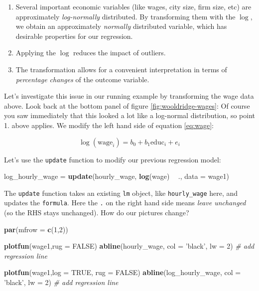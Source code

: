 \documentclass[]{book}
\newenvironment{Shaded}{\begin{snugshade}}{\end{snugshade}}
\newcommand{\KeywordTok}[1]{\textcolor[rgb]{0.13,0.29,0.53}{\textbf{#1}}}
\newcommand{\DataTypeTok}[1]{\textcolor[rgb]{0.13,0.29,0.53}{#1}}
\newcommand{\DecValTok}[1]{\textcolor[rgb]{0.00,0.00,0.81}{#1}}
\newcommand{\StringTok}[1]{\textcolor[rgb]{0.31,0.60,0.02}{#1}}
\newcommand{\CommentTok}[1]{\textcolor[rgb]{0.56,0.35,0.01}{\textit{#1}}}
\newcommand{\OtherTok}[1]{\textcolor[rgb]{0.56,0.35,0.01}{#1}}
\newcommand{\OperatorTok}[1]{\textcolor[rgb]{0.81,0.36,0.00}{\textbf{#1}}}
\newcommand{\NormalTok}[1]{#1}
\providecommand{\tightlist}{%
  \setlength{\itemsep}{0pt}\setlength{\parskip}{0pt}}
\begin{document}
\begin{enumerate}
\def\labelenumi{\arabic{enumi}.}
\tightlist
\item
  Several important economic variables (like wages, city size, firm
  size, etc) are approximately \emph{log-normally} distributed. By
  transforming them with the \(\log\), we obtain an approximately
  \emph{normally} distributed variable, which has desirable properties
  for our regression.
\item
  Applying the \(\log\) reduces the impact of outliers.
\item
  The transformation allows for a convenient interpretation in terms of
  \emph{percentage changes} of the outcome variable.
\end{enumerate}

Let's investigate this issue in our running example by transforming the
wage data above. Look back at the bottom panel of figure
\ref{fig:wooldridge-wages}: Of course you saw immediately that this
looked a lot like a log-normal distribution, so point 1. above applies.
We modify the left hand side of equation \eqref{eq:wage}:

\begin{equation}
\log(\text{wage}_i) = b_0 + b_1 \text{educ}_i + e_i \label{eq:log-wage}
\end{equation}

Let's use the \texttt{update} function to modify our previous regression
model:

\begin{Shaded}
\begin{Highlighting}[]
\NormalTok{log_hourly_wage =}\StringTok{ }\KeywordTok{update}\NormalTok{(hourly_wage, }\KeywordTok{log}\NormalTok{(wage) }\OperatorTok{~}\StringTok{ }\NormalTok{., }\DataTypeTok{data =}\NormalTok{ wage1)}
\end{Highlighting}
\end{Shaded}

The \texttt{update} function takes an existing \texttt{lm} object, like
\texttt{hourly\_wage} here, and updates the \texttt{formula}. Here the
\texttt{.} on the right hand side means \emph{leave unchanged} (so the
RHS stays unchanged). How do our pictures change?

\begin{Shaded}
\begin{Highlighting}[]
\KeywordTok{par}\NormalTok{(}\DataTypeTok{mfrow =} \KeywordTok{c}\NormalTok{(}\DecValTok{1}\NormalTok{,}\DecValTok{2}\NormalTok{))}

\KeywordTok{plotfun}\NormalTok{(wage1,}\DataTypeTok{rug =} \OtherTok{FALSE}\NormalTok{)}
\KeywordTok{abline}\NormalTok{(hourly_wage, }\DataTypeTok{col =} \StringTok{'black'}\NormalTok{, }\DataTypeTok{lw =} \DecValTok{2}\NormalTok{) }\CommentTok{# add regression line}

\KeywordTok{plotfun}\NormalTok{(wage1,}\DataTypeTok{log =} \OtherTok{TRUE}\NormalTok{, }\DataTypeTok{rug =} \OtherTok{FALSE}\NormalTok{)}
\KeywordTok{abline}\NormalTok{(log_hourly_wage, }\DataTypeTok{col =} \StringTok{'black'}\NormalTok{, }\DataTypeTok{lw =} \DecValTok{2}\NormalTok{) }\CommentTok{# add regression line}
\end{Highlighting}
\end{Shaded}
\end{document}
